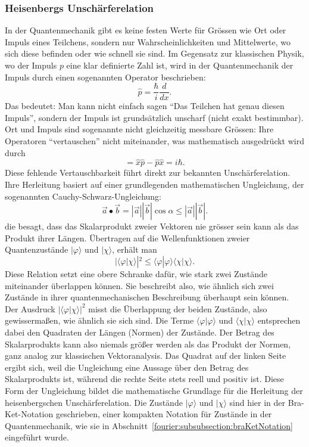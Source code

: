 	\subsubsection{Heisenbergs Unschärferelation%
	\label{fourier:subsubsection:unschaerferelation}}
	In der Quantenmechanik gibt es keine festen Werte für Grössen wie Ort oder Impuls eines Teilchens, sondern nur Wahrscheinlichkeiten und Mittelwerte, wo sich diese befinden oder wie schnell sie sind.
	Im Gegensatz zur klassischen Physik, wo der Impuls $p$ eine klar definierte Zahl ist, wird in der Quantenmechanik der Impuls durch einen sogenannten Operator beschrieben:
	\begin{equation}
		\hat{p} = \frac{\hbar}{i} \frac{d}{dx}.
	\end{equation}
	Das bedeutet:
	Man kann nicht einfach sagen ``Das Teilchen hat genau diesen Impuls'', sondern der Impuls ist grundsätzlich unscharf (nicht exakt bestimmbar).
	Ort und Impuls sind sogenannte nicht gleichzeitig messbare Grössen:
	Ihre Operatoren ``vertauschen'' nicht miteinander, was mathematisch ausgedrückt wird durch
	\begin{equation}
		[\hat{x},\hat{p}] = \hat{x} \hat{p} - \hat{p} \hat{x} = i \hbar.
	\end{equation}
	Diese fehlende Vertauschbarkeit führt direkt zur bekannten Unschärferelation.
	Ihre Herleitung basiert auf einer grundlegenden mathematischen Ungleichung, der sogenannten Cauchy-Schwarz-Ungleichung:
	\begin{equation}
		\vec{a} \bullet \vec{b} = |\vec{a}| |\vec{b}|\cos\alpha \le |\vec{a}| |\vec{b}|.
	\end{equation}
	die besagt, dass das Skalarprodukt zweier Vektoren nie grösser sein kann als das Produkt ihrer Längen.
	Übertragen auf die Wellenfunktionen zweier Quantenzustände $|\varphi\rangle$ und $|\chi\rangle$, erhält man
	\begin{equation}
		|\langle\varphi | \chi\rangle|^2 \le \langle\varphi | \varphi\rangle \langle\chi | \chi\rangle.
	\end{equation}
	Diese Relation setzt eine obere Schranke dafür, wie stark zwei Zustände miteinander überlappen können. Sie beschreibt also, wie ähnlich sich zwei Zustände in ihrer quantenmechanischen Beschreibung überhaupt sein können.
	Der Ausdruck $|\langle\varphi|\chi\rangle|^2$ misst die Überlappung der beiden Zustände, also gewissermaßen, wie ähnlich sie sich sind.
	Die Terme $\langle\varphi|\varphi\rangle$ und $\langle\chi|\chi\rangle$ entsprechen dabei den Quadraten der Längen (Normen) der Zustände.
	Der Betrag des Skalarprodukts kann also niemals größer werden als das Produkt der Normen, ganz analog zur klassischen Vektoranalysis.
	Das Quadrat auf der linken Seite ergibt sich, weil die Ungleichung eine Aussage über den Betrag des Skalarprodukts ist, während die rechte Seite stets reell und positiv ist.
	Diese Form der Ungleichung bildet die mathematische Grundlage für die Herleitung der heisenbergschen Unschärferelation.
	Die Zustände $|\varphi\rangle$ und $|\chi\rangle$ sind hier in der Bra-Ket-Notation geschrieben, einer kompakten Notation für Zustände in der Quantenmechanik, wie sie in Abschnitt~\ref{fourier:subsubsection:braKetNotation} eingeführt wurde.

